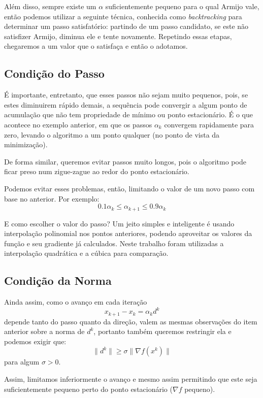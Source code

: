 \documentclass[a4paper,11pt]{article}
\begin{document}
            Além disso, sempre existe um $\alpha$ suficientemente pequeno para o qual Armijo vale, então podemos utilizar
            a seguinte técnica, conhecida como \emph{backtracking} para determinar um passo satisfatório: partindo de um
            passo candidato, se este não satisfizer Armijo, diminua ele e tente novamente. Repetindo essas etapas, chegaremos a
            um valor que o satisfaça e então o adotamos.

        \subsection*{Condição do Passo}
            É importante, entretanto, que esses passos não sejam muito pequenos, pois, se estes diminuirem rápido demais, a sequência pode
            convergir a algum ponto de acumulação que não tem propriedade de mínimo ou ponto estacionário. É o que acontece
            no exemplo anterior, em que os passos $\alpha_k$ convergem rapidamente para zero, levando o algoritmo a um ponto
            qualquer (no ponto de vista da minimização).

            De forma similar, queremos evitar passos muito longos, pois o algoritmo pode ficar preso num zigue-zague ao redor do
            ponto estacionário.

            Podemos evitar esses problemas, então, limitando o valor de um novo passo com base no anterior. Por exemplo:
            $$ 0.1\alpha_k \leq \alpha_{k+1} \leq 0.9\alpha_k$$

            E como escolher o valor do passo? Um jeito simples e inteligente é usando interpolação polinomial nos pontos
            anteriores, podendo aproveitar os valores da função e seu gradiente já calculados. Neste trabalho foram utilizadas
            a interpolação quadrática e a cúbica para comparação.

        \subsection*{Condição da Norma}
            Ainda assim, como o avanço em cada iteração
                $$x_{k+1} - x_k = \alpha_k d^k$$
            depende tanto do passo quanto da direção, valem as mesmas observações do item anterior sobre a norma de $d^k$, portanto
            também queremos restringir ela e podemos exigir que:
                $$ \|d^k\| \geq \sigma \|\nabla f(x^k) \|$$
            para algum $\sigma > 0$.

            Assim, limitamos inferiormente o avanço e mesmo assim permitindo que este seja suficientemente pequeno perto do ponto estacionário
            ($ \nabla f $ pequeno).
\end{document}
